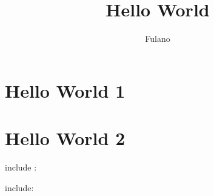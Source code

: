 \documentclass[A4paper, 12pt]{article}
\title{Hello World}
\author{Fulano}
\begin{document}
\maketitle
\tableofcontents


\section{Hello World 1} %



\section{Hello World 2} %






include : 



include: 

%
%
\end{document}
